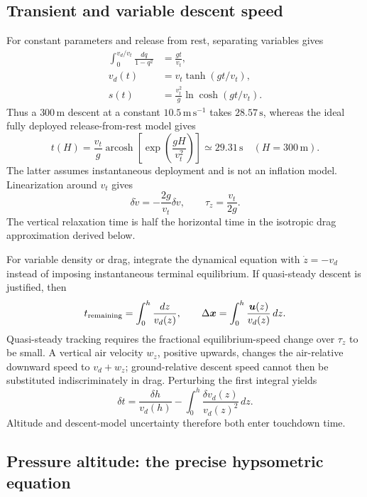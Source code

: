 \subsection{Transient and variable descent speed}

For constant parameters and release from rest, separating variables gives
\begin{align}
 \int_0^{v_d/v_t}\frac{dq}{1-q^2}&=\frac{gt}{v_t},\\
 v_d(t)&=v_t\tanh(gt/v_t),\\
 s(t)&=\frac{v_t^2}{g}\ln\cosh(gt/v_t).
\end{align}
Thus a $300\,\mathrm m$ descent at a constant
$10.5\,\mathrm{m\,s^{-1}}$ takes $28.57\,\mathrm s$, whereas the ideal
fully deployed release-from-rest model gives
\begin{equation}
 t(H)=\frac{v_t}{g}\operatorname{arcosh}
       \left[\exp\left(\frac{gH}{v_t^2}\right)\right]
 \simeq29.31\,\mathrm s\quad(H=300\,\mathrm m).
\end{equation}
The latter assumes instantaneous deployment and is not an inflation model.
Linearization around $v_t$ gives
\begin{equation}
 \delta\dot v=-\frac{2g}{v_t}\delta v,
 \qquad \tau_z=\frac{v_t}{2g}.
\end{equation}
The vertical relaxation time is half the horizontal time in the isotropic
drag approximation derived below.

For variable density or drag, integrate the dynamical equation with
$\dot z=-v_d$ instead of imposing instantaneous terminal equilibrium.
If quasi-steady descent is justified, then
\begin{equation}
 t_{\rm remaining}=\int_0^h\frac{dz}{v_d(z)},\qquad
 \Delta\boldsymbol x=\int_0^h\frac{\boldsymbol u(z)}{v_d(z)}\,dz.
\end{equation}
Quasi-steady tracking requires the fractional equilibrium-speed change
over $\tau_z$ to be small. A vertical air velocity $w_z$, positive upwards,
changes the air-relative downward speed to $v_d+w_z$; ground-relative
descent speed cannot then be substituted indiscriminately in drag.
Perturbing the first integral yields
\begin{equation}
 \delta t=\frac{\delta h}{v_d(h)}
 -\int_0^h\frac{\delta v_d(z)}{v_d(z)^2}\,dz.
\end{equation}
Altitude and descent-model uncertainty therefore both enter touchdown time.

\subsection{Pressure altitude: the precise hypsometric equation}

